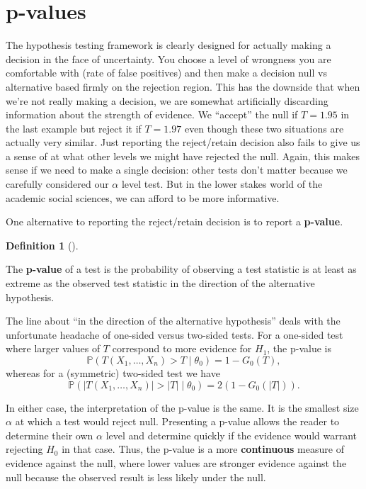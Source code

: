 \documentclass[
  letterpaper,
  DIV=11,
  numbers=noendperiod]{scrreprt}
\renewcommand{\P}{\mathbb{P}}
\theoremstyle{definition}
\newtheorem{definition}{Definition}[chapter]
\theoremstyle{plain}
\theoremstyle{definition}
\theoremstyle{remark}
\begin{document}
\hypertarget{p-values}{%
\section{p-values}\label{p-values}}

The hypothesis testing framework is clearly designed for actually making
a decision in the face of uncertainty. You choose a level of wrongness
you are comfortable with (rate of false positives) and then make a
decision null vs alternative based firmly on the rejection region. This
has the downside that when we're not really making a decision, we are
somewhat artificially discarding information about the strength of
evidence. We ``accept'' the null if \(T = 1.95\) in the last example but
reject it if \(T = 1.97\) even though these two situations are actually
very similar. Just reporting the reject/retain decision also fails to
give us a sense of at what other levels we might have rejected the null.
Again, this makes sense if we need to make a single decision: other
tests don't matter because we carefully considered our \(\alpha\) level
test. But in the lower stakes world of the academic social sciences, we
can afford to be more informative.

One alternative to reporting the reject/retain decision is to report a
\textbf{p-value}.

\leavevmode{}%
\begin{definition}[]\label{def-p-value}

The \textbf{p-value} of a test is the probability of observing a test
statistic is at least as extreme as the observed test statistic in the
direction of the alternative hypothesis.

\end{definition}

The line about ``in the direction of the alternative hypothesis'' deals
with the unfortunate headache of one-sided versus two-sided tests. For a
one-sided test where larger values of \(T\) correspond to more evidence
for \(H_1\), the p-value is \[
\P(T(X_1,\ldots,X_n) > T \mid \theta_0) = 1 - G_0(T),
\] whereas for a (symmetric) two-sided test we have \[ 
\P(|T(X_1, \ldots, X_n)| > |T| \mid \theta_0) = 2(1 - G_0(|T|)).
\]

In either case, the interpretation of the p-value is the same. It is the
smallest size \(\alpha\) at which a test would reject null. Presenting a
p-value allows the reader to determine their own \(\alpha\) level and
determine quickly if the evidence would warrant rejecting \(H_0\) in
that case. Thus, the p-value is a more \textbf{continuous} measure of
evidence against the null, where lower values are stronger evidence
against the null because the observed result is less likely under the
null.
\end{document}
